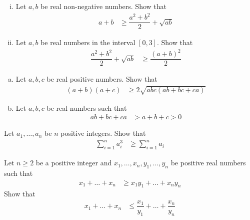 \documentclass{subfile}
\begin{document}
		\begin{problem}
			\begin{enumerate}[(i)]
				\item Let $a,b$ be real non-negative numbers. Show that
					\begin{align*}
						a+b
							& \geq \dfrac{a^{2}+b^{2}}{2}+\sqrt{ab}
					\end{align*}
				\item Let $a,b$ be real numbers in the interval $[0,3]$. Show that
					\begin{align*}
						\dfrac{a^{2}+b^{2}}{2}+\sqrt{ab}
							& \geq \dfrac{(a+b)^{2}}{2}
					\end{align*}
			\end{enumerate}
		\end{problem}
	
		\begin{problem}
			\begin{enumerate}[(a)]
				\item Let $a,b,c$ be real positive numbers. Show that
					\begin{align*}
						(a+b)(a+c)
							& \geq2\sqrt{abc(ab+bc+ca)}
					\end{align*}
				\item Let $a,b,c$ be real numbers such that
					\begin{align*}
						ab+bc+ca
							& > a+b+c>0
					\end{align*}
			\end{enumerate}
		\end{problem}
	
		\begin{problem}
			Let $a_{1},\ldots,a_{n}$ be $n$ positive integers. Show that
				\begin{align*}
					\sum_{i=1}^{n}a_{i}^{3}
						& \geq\sum_{i=1}^{n}a_{i}
				\end{align*}
		\end{problem}
	
		\begin{problem}
			Let $n\geq2$ be a positive integer and $x_{1},\ldots,x_{n},y_{1},\ldots,y_{n}$ be positive real numbers such that
				\begin{align*}
					x_{1}+\ldots+x_{n}
						& \geq x_{1}y_{1}+\ldots+x_{n}y_{n}
				\end{align*}
			Show that
				\begin{align*}
					x_{1}+\ldots+x_{n}
						& \leq \dfrac{x_{1}}{y_{1}}+\ldots+\dfrac{x_{n}}{y_{n}}
				\end{align*}
		\end{problem}
	
\end{document}
